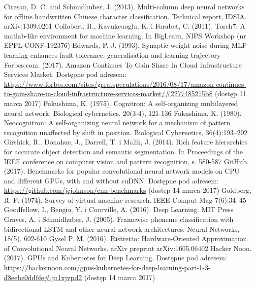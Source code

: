 \documentclass[12pt,a4paper,twoside]{article}
\begin{document}
\begin{thebibliography}{99}
 Ciresan, D. C. and Schmidhuber, J. (2013). Multi-column deep neural networks for offline handwritten Chinese character classification. Technical report, IDSIA. arXiv:1309.0261
 Collobert, R., Kavukcuoglu, K. i Farabet, C. (2011). Torch7: A matlab-like environment for machine learning. In BigLearn, NIPS Workshop (nr EPFL-CONF-192376)
 Edwards, P. J. (1993). Synaptic weight noise during MLP learning enhances fault-tolerance, generalisation and learning trajectory
 Forbes.com. (2017). Amazon Continues To Gain Share In Cloud Infrastructure Services Market. Dostępne pod adresem: \url{https://www.forbes.com/sites/greatspeculations/2016/08/17/amazon-continues-to-gain-share-in-cloud-infrastructure-services-market/#2277485215b8} (dostęp 11 marca 2017)
 Fukushima, K. (1975). Cognitron: A self-organizing multilayered neural network. Biological cybernetics, 20(3-4), 121-136
 Fukushima, K. (1980). Neocognitron: A self-organizing neural network for a mechanism of pattern
recognition unaffected by shift in position. Biological Cybernetics, 36(4):193–202
 Girshick, R., Donahue, J., Darrell, T. i Malik, J. (2014). Rich feature hierarchies for accurate object detection and semantic segmentation. In Proceedings of the IEEE conference on computer vision and pattern recognition, s. 580-587
 GitHub. (2017). Benchmarks for popular convolutional neural network models on CPU and different GPUs, with and without cuDNN. Dostępne pod adresem: \url{https://github.com/jcjohnson/cnn-benchmarks} (dostęp 14 marca 2017)
 Goldberg, R. P. (1974). Survey of virtual machine research. IEEE Comput Mag 7(6):34–45
 Goodfellow, I., Bengio, Y. i Courville, A. (2016). Deep Learning. MIT Press
 Graves, A. i Schmidhuber, J. (2005). Framewise phoneme classification with bidirectional LSTM and other neural network architectures. Neural Networks, 18(5), 602-610
 Gysel P. M. (2016). Ristretto: Hardware-Oriented Approximation of Convolutional Neural Networks. arXiv preprint arXiv:1605.06402
 Hacker Noon. (2017). GPUs and Kubernetes for Deep Learning. Dostępne pod adresem: \url{https://hackernoon.com/gpus-kubernetes-for-deep-learning-part-1-3-d8eebe0dd6fe#.jn1xjvpd2} (dostęp 14 marca 2017)

\end{thebibliography}
\end{document}
